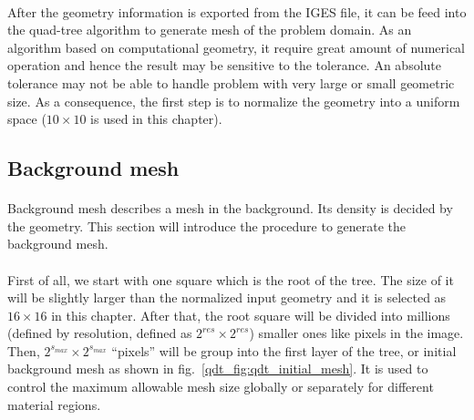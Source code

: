 \paragraph{}
After the geometry information is exported from the IGES file, it can be feed into the quad-tree algorithm to generate mesh of the problem domain.
As an algorithm based on computational geometry, it require great amount of numerical operation and hence the result may be sensitive to the tolerance.
An absolute tolerance may not be able to handle problem with very large or small geometric size.
As a consequence, the first step is to normalize the geometry into a uniform space ($10\times10$ is used in this chapter).

\subsection{Background mesh}
\label{qdt_sc:qdt_background_mesh}
\paragraph{}
Background mesh describes a mesh in the background. %
Its density is decided by the geometry.
This section will introduce the procedure to generate the background mesh.
\paragraph{}
First of all, we start with one square which is the root of the tree.
The size of it will be slightly larger than the normalized input geometry and it is selected as $16 \times 16$ in this chapter.
After that, the root square will be divided into millions (defined by resolution, defined as $2^{res} \times 2^{res}$) smaller ones like pixels in the image.
Then, $2^{s_{max}} \times 2^{s_{max}}$ ``pixels'' will be group into the first layer of the tree, or initial background mesh as shown in fig.~\ref{qdt_fig:qdt_initial_mesh}.
It is used to control the maximum allowable mesh size globally or separately for different material regions.

